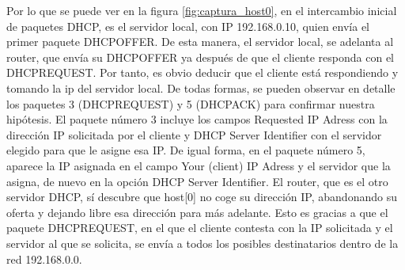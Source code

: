 Por lo que se puede ver en la figura \ref{fig:captura_host0}, en el intercambio inicial de paquetes DHCP, es el servidor local, con IP 192.168.0.10, quien envía el primer paquete DHCPOFFER. De esta manera, el servidor local, se adelanta al router, que envía su DHCPOFFER ya después de que el cliente responda con el DHCPREQUEST. Por tanto, es obvio deducir que el cliente está respondiendo y tomando la ip del servidor local. De todas formas, se pueden observar en detalle los paquetes 3 (DHCPREQUEST) y 5 (DHCPACK) para confirmar nuestra hipótesis. El paquete número 3 incluye los campos Requested IP Adress con la dirección IP solicitada por el cliente y DHCP Server Identifier con el servidor elegido para que le asigne esa IP. De igual forma, en el paquete número 5, aparece la IP asignada en el campo Your (client) IP Adress y el servidor que la asigna, de nuevo en la opción DHCP Server Identifier.
El router, que es el otro servidor DHCP, sí descubre que host[0] no coge su dirección IP, abandonando su oferta y dejando libre esa dirección para más adelante. Esto es gracias a que el paquete DHCPREQUEST, en el que el cliente contesta con la IP solicitada y el servidor al que se solicita, se envía a todos los posibles destinatarios dentro de la red 192.168.0.0.

